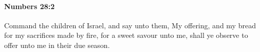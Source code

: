 
		\paragraph{Numbers 28:2} %
			\label{NUMBERS-28-2}

			Command the children of Israel, and say unto them, My offering, and my bread for my sacrifices made by fire, for a sweet savour unto me, shall ye observe to offer unto me in their due season.


